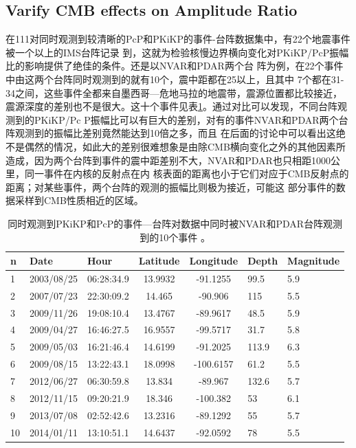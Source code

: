 \subsection{Varify CMB effects on Amplitude Ratio}

在111对同时观测到较清晰的PcP和PKiKP的事件-台阵数据集中，有22个地震事件被一个以上的IMS台阵记录
到，这就为检验核慢边界横向变化对PKiKP/PcP振幅比的影响提供了绝佳的条件。还是以NVAR和PDAR两个台
阵为例，在22个事件中由这两个台阵同时观测到的就有10个，震中距都在25{\textdegree}以上，且其中
7个都在31-34{\textdegree}之间，这些事件全都来自墨西哥—危地马拉的地震带，震源位置都比较接近，
震源深度的差别也不是很大。这十个事件见表\ref{nvpd}。通过对比可以发现，不同台阵观测到的PKiKP/Pc
P振幅比可以有巨大的差别，对有的事件NVAR和PDAR两个台阵观测到的振幅比差别竟然能达到10倍之多，而且
在后面的讨论中可以看出这绝不是偶然的情况，如此大的差别很难想象是由除CMB横向变化之外的其他因素所
造成，因为两个台阵到事件的震中距差别不大，NVAR和PDAR也只相距1000公里，同一事件在内核的反射点在内
核表面的距离也小于它们对应于CMB反射点的距离；对某些事件，两个台阵的观测的振幅比则极为接近，可能这
部分事件的数据采样到CMB性质相近的区域。

\begin{table}[!ht]
	\centering
	\begin{tabular}{*{3}{l}*{2}{c}*{2}{l}}
	\hline
	n & Date & Hour & Latitude & Longitude & Depth & Magnitude\\
	\hline
1 & 2003/08/25 & 06:28:34.9 &  13.9932 &  -91.1255 &  99.5 & 5.9\\
2 & 2007/07/23 & 22:30:09.2 &  14.465  &  -90.906  &  115  & 5.5\\
3 & 2009/11/26 & 19:08:10.4 &  13.4767 &  -89.9617 &  48.5 & 5.9\\
4 & 2009/04/27 & 16:46:27.5 &  16.9557 &  -99.5717 &  31.7 & 5.8\\
5 & 2009/05/03 & 16:21:46.4 &  14.6199 &  -91.2025 &  113.9 & 6.3\\
6 & 2009/08/15 & 13:22:43.1 &  18.0998 & -100.6157 &  61.2 & 5.5\\
7 & 2012/06/27 & 06:30:59.8 &  13.834  &  -89.967  &  132.6 & 5.7\\
8 & 2012/11/15 & 09:20:21.9 &  18.346  & -100.382  &  53  & 6.1\\
9 & 2013/07/08 & 02:52:42.6 &  13.2316 &  -89.1292 &  55  & 5.7\\
10 & 2014/01/11 & 13:10:51.1 &  14.6437 &  -92.0592 &  78  & 5.5\\
	\hline
\end{tabular}
	\caption{同时观测到PKiKP和PcP的事件—台阵对数据中同时被NVAR和PDAR台阵观测到的10个事件%
。}
	\label{nvpd}
\end{table}

